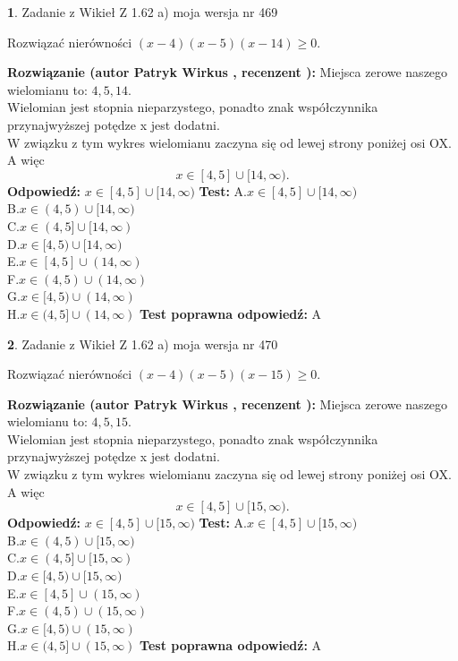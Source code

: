 \documentclass[12pt, a4paper]{article}
\theoremstyle{definition} %
\newtheorem{zad}{}
\newcommand{\zadStart}[1]{\begin{zad}#1\newline}
\newcommand{\zadStop}{\end{zad}}
\newcommand{\rozwStart}[2]{\noindent \textbf{Rozwiązanie (autor #1 , recenzent #2): }\newline}
\newcommand{\rozwStop}{\newline}
\newcommand{\odpStart}{\noindent \textbf{Odpowiedź:}\newline}
\newcommand{\odpStop}{\newline}
\newcommand{\testStart}{\noindent \textbf{Test:}\newline}
\newcommand{\testStop}{\newline}
\newcommand{\kluczStart}{\noindent \textbf{Test poprawna odpowiedź:}\newline}
\newcommand{\kluczStop}{\newline}
\begin{document}
\zadStart{Zadanie z Wikieł Z 1.62 a) moja wersja nr 469}

Rozwiązać nierówności $(x-4)(x-5)(x-14)\ge0$.
\zadStop
\rozwStart{Patryk Wirkus}{}
Miejsca zerowe naszego wielomianu to: $4, 5, 14$.\\
Wielomian jest stopnia nieparzystego, ponadto znak współczynnika przy\linebreak najwyższej potędze x jest dodatni.\\ W związku z tym wykres wielomianu zaczyna się od lewej strony poniżej osi OX. A więc $$x \in [4,5] \cup [14,\infty).$$
\rozwStop
\odpStart
$x \in [4,5] \cup [14,\infty)$
\odpStop
\testStart
A.$x \in [4,5] \cup [14,\infty)$\\
B.$x \in (4,5) \cup [14,\infty)$\\
C.$x \in (4,5] \cup [14,\infty)$\\
D.$x \in [4,5) \cup [14,\infty)$\\
E.$x \in [4,5] \cup (14,\infty)$\\
F.$x \in (4,5) \cup (14,\infty)$\\
G.$x \in [4,5) \cup (14,\infty)$\\
H.$x \in (4,5] \cup (14,\infty)$
\testStop
\kluczStart
A
\kluczStop



\zadStart{Zadanie z Wikieł Z 1.62 a) moja wersja nr 470}

Rozwiązać nierówności $(x-4)(x-5)(x-15)\ge0$.
\zadStop
\rozwStart{Patryk Wirkus}{}
Miejsca zerowe naszego wielomianu to: $4, 5, 15$.\\
Wielomian jest stopnia nieparzystego, ponadto znak współczynnika przy\linebreak najwyższej potędze x jest dodatni.\\ W związku z tym wykres wielomianu zaczyna się od lewej strony poniżej osi OX. A więc $$x \in [4,5] \cup [15,\infty).$$
\rozwStop
\odpStart
$x \in [4,5] \cup [15,\infty)$
\odpStop
\testStart
A.$x \in [4,5] \cup [15,\infty)$\\
B.$x \in (4,5) \cup [15,\infty)$\\
C.$x \in (4,5] \cup [15,\infty)$\\
D.$x \in [4,5) \cup [15,\infty)$\\
E.$x \in [4,5] \cup (15,\infty)$\\
F.$x \in (4,5) \cup (15,\infty)$\\
G.$x \in [4,5) \cup (15,\infty)$\\
H.$x \in (4,5] \cup (15,\infty)$
\testStop
\kluczStart
A
\kluczStop
\end{document}
